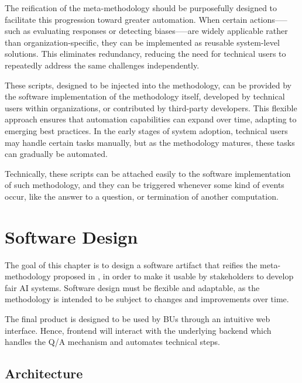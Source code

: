 \documentclass[12pt,a4paper,openright,twoside]{book}
\begin{document}
The reification of the meta-methodology should be purposefully designed to facilitate this progression toward greater automation. 
%
When certain actions--—such as evaluating responses or detecting biases--—are widely applicable rather than organization-specific, they can be implemented as reusable system-level solutions.
%
This eliminates redundancy, reducing the need for technical users to repeatedly address the same challenges independently.

These scripts, designed to be injected into the methodology, can be provided by the software implementation of the methodology itself, developed by technical users within organizations, or contributed by third-party developers.
%
This flexible approach ensures that automation capabilities can expand over time, adapting to emerging best practices.
%
In the early stages of system adoption, technical users may handle certain tasks manually, but as the methodology matures, these tasks can gradually be automated.

Technically, these scripts can be attached easily to the  software implementation of such methodology, and they can be triggered whenever some kind of events occur, like the answer to a question, or termination of another computation.



\chapter{Software Design}%
\label{chap:design}

The goal of this chapter is to design a software artifact that reifies the meta-methodology proposed in , 
in order to make it usable by stakeholders to develop fair \ac{AI} systems.
%
Software design must be flexible and adaptable, as the methodology is intended to be subject to changes and improvements over time.

The final product is designed to be used by \acfp{BU} through an intuitive web interface.
%
Hence, frontend will interact with the underlying backend which handles the \ac{Q/A} mechanism and automates technical steps.

\section{Architecture}
\end{document}
